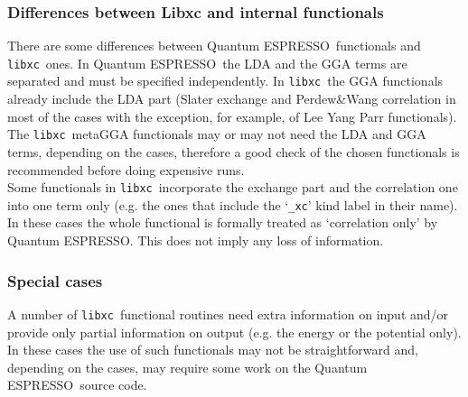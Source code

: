 \documentclass[12pt,a4paper]{article}
\def\qe{{\sc Quantum ESPRESSO}}
\def\libxc{\texttt{libxc}}
\begin{document}
\subsubsection{Differences between Libxc and internal functionals}
There are some differences between \qe\ functionals and \libxc\ ones. In \qe\ the LDA and the GGA terms are separated and must be specified independently. In \libxc\ the GGA functionals already include the LDA part (Slater exchange and Perdew\&Wang correlation in most of the cases with the exception, for example, of Lee Yang Parr functionals).\\
The \libxc\ metaGGA functionals may or may not need the LDA and GGA terms, depending on the cases, therefore a good check of the chosen functionals is recommended before doing expensive runs.\\
Some functionals in \libxc\ incorporate the exchange part and the correlation one into one term only (e.g. the ones that include the `\texttt{\_xc}' kind label in their name). In these cases the whole functional is formally treated as `correlation only' by \qe. This does not imply any loss of information.
%
\subsubsection{Special cases}
A number of \libxc\ functional routines need extra information on input and/or provide only partial information on output (e.g. the energy or the potential only). In these cases the use of such functionals may not be straightforward and, depending on the cases, may require some work on the \qe\ source code.
%
\end{document}
